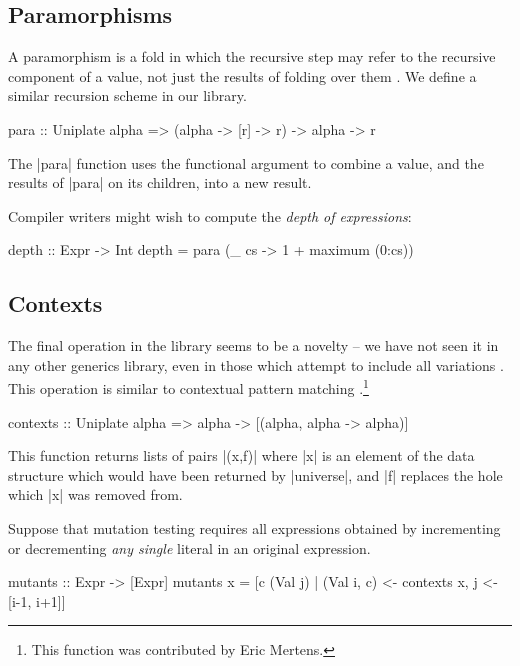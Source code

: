 \subsection{Paramorphisms}

A paramorphism is a fold in which the recursive step may refer to the recursive component of a value, not just the results of folding over them \cite{meertens:paramorphisms}. We define a similar recursion scheme in our library.

\begin{code}
para :: Uniplate alpha => (alpha -> [r] -> r) -> alpha -> r
\end{code}

The |para| function uses the functional argument to combine a value, and the results of |para| on its children, into a new result.

\begin{example}
Compiler writers might wish to compute the \textit{depth of expressions}:

\begin{code}
depth :: Expr -> Int
depth = para (\_ cs -> 1 + maximum (0:cs))
\end{code}\codeexample
\end{example}

\subsection{Contexts}

The final operation in the library seems to be a novelty -- we have not seen it in any other generics library, even in those which attempt to include all variations \citep{ren:generic_recursion_toolbox}. This operation is similar to contextual pattern matching \citep{mohnen:context_patterns}.\footnote{This function was contributed by Eric Mertens.}

\begin{code}
contexts :: Uniplate alpha => alpha -> [(alpha, alpha -> alpha)]
\end{code}

This function returns lists of pairs |(x,f)| where |x| is an element of the data structure which would have been returned by |universe|, and |f| replaces the hole which |x| was removed from.

\begin{example}
Suppose that mutation testing requires all expressions obtained by incrementing or decrementing \textit{any single} literal in an original expression.

\begin{code}
mutants :: Expr -> [Expr]
mutants x =  [c (Val j) | (Val i, c) <- contexts x,  j <- [i-1, i+1]]
\end{code}
\end{example}

